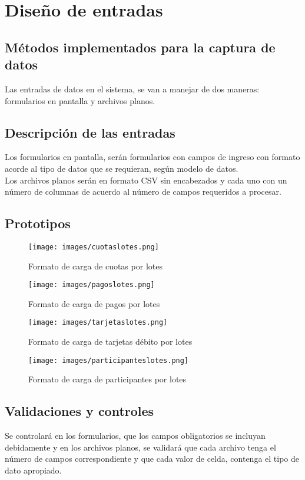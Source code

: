 \chapter{Dise\~no de entradas}
\section{M\'etodos implementados para la captura de datos}
Las entradas de datos en el sistema, se van a manejar de dos maneras: formularios en pantalla y archivos planos.%
\section{Descripci\'on de las entradas}
Los formularios en pantalla, ser\'an formularios con campos de ingreso con formato acorde al tipo de datos que se requieran, seg\'un modelo de datos.%
\\%
Los archivos planos ser\'an en formato CSV sin encabezados y cada uno con un n\'umero de columnas de acuerdo al n\'umero de campos requeridos a procesar.%
%
\section{Prototipos}
%
\begin{figure}[htbp]
	\centering
		\texttt{[image: images/cuotaslotes.png]}
	\caption{Formato de carga de cuotas por lotes}
	\label{fig:cuotaslotes}
\end{figure}%
%
\begin{figure}[htbp]
	\centering
		\texttt{[image: images/pagoslotes.png]}
	\caption{Formato de carga de pagos por lotes}
	\label{fig:pagoslotes}
\end{figure}%
%
\begin{figure}[htbp]
	\centering
		\texttt{[image: images/tarjetaslotes.png]}
	\caption{Formato de carga de tarjetas d\'ebito por lotes}
	\label{fig:tarjetaslotes}
\end{figure}%
%
\begin{figure}[htbp]
	\centering
		\texttt{[image: images/participanteslotes.png]}
	\caption{Formato de carga de participantes por lotes}
	\label{fig:participanteslotes}
\end{figure}%
%
\newpage%
\section{Validaciones y controles}
Se controlar\'a en los formularios, que los campos obligatorios se incluyan debidamente y en los archivos planos, se validar\'a que cada archivo tenga el n\'umero de campos correspondiente y que cada valor de celda, contenga el tipo de dato apropiado.%